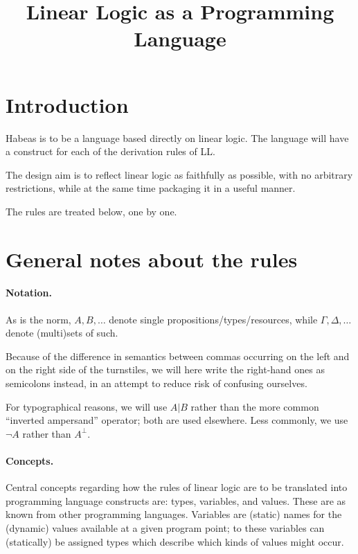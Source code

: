 \documentclass[a4paper]{article}
\title{Linear Logic as a Programming Language}
\begin{document}
\maketitle

\section{Introduction}

Habeas is to be a language based directly on linear logic.
The language will have a construct for each of the derivation rules of LL.

The design aim is to reflect linear logic as faithfully as possible,
with no arbitrary restrictions, while at the same time packaging it in
a useful manner.

The rules are treated below, one by one.

\section{General notes about the rules}

\paragraph{Notation.}
As is the norm, $A, B, \ldots$ denote single
propositions/types/resources, while $\Gamma, \Delta, \ldots$ denote
(multi)sets of such.

Because of the difference in semantics between commas occurring on the
left and on the right side of the turnstiles, we will here write the
right-hand ones as semicolons instead, in an attempt to reduce risk of
confusing ourselves.

For typographical reasons, we will use $A|B$ rather than the more
common ``inverted ampersand'' operator; both are used elsewhere.
Less commonly, we use $\lnot A$ rather than $A^\bot$.

\paragraph{Concepts.} Central concepts regarding how the rules of
linear logic are to be translated into programming language constructs
are: types, variables, and values. These are as known from other
programming languages.
Variables are (static) names for the (dynamic) values available at a
given program point; to these variables can (statically) be assigned
types which describe which kinds of values might occur.
\end{document}
